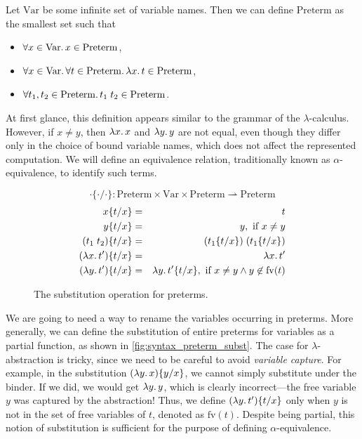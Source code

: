 \newcommand\Preterm{\mathrm{Preterm}}
\newcommand\Term{\mathrm{Term}}
\newcommand\Var{\mathrm{Var}}
\newcommand\FVars[1]{\mathrm{fv}(#1)}
\newcommand\Subst[3]{#1\{#2/#3\}}
\newcommand\Aeq{\equiv_\alpha}

Let $\Var$ be some infinite set of variable names.
Then we can define $\Preterm$ as the smallest set such that
\begin{itemize}
\item $\forall x \in \Var\ldotp x \in \Preterm$,
\item $\forall x \in \Var\ldotp\forall t \in \Preterm\ldotp \lambda x\ldotp t \in \Preterm$,
\item $\forall t_1, t_2 \in \Preterm\ldotp t_1\;t_2 \in \Preterm$.
\end{itemize}
At first glance, this definition appears similar to the grammar of the
$\lambda$-calculus.
However, if $x \neq y$, then $\lambda x\ldotp x$ and $\lambda y\ldotp y$ are
not equal, even though they differ only in the choice of bound variable names,
which does not affect the represented computation. We will define an
equivalence relation, traditionally known as $\alpha$-equivalence, to identify
such terms.

\begin{figure}[t!!]
\[
  \Subst{\cdot}{\cdot}{\cdot} \colon
  \Preterm \times \Var \times \Preterm \rightharpoonup \Preterm
\]
\begin{eqnarray*}
  \Subst{x}{t}{x}          & = & t \\
  \Subst{y}{t}{x}          & = & y, \text{ if } x \ne y \\
  \Subst{(t_1\;t_2)}{t}{x} & = & (\Subst{t_1}{t}{x})\;(\Subst{t_1}{t}{x}) \\
  \Subst{(\lambda x\ldotp t')}{t}{x} & = & \lambda x\ldotp t' \\
  \Subst{(\lambda y\ldotp t')}{t}{x} & = & \lambda y\ldotp \Subst{t'}{t}{x}, \text{ if } x \ne y \land y \not\in \FVars{t}
\end{eqnarray*}
\caption{The substitution operation for preterms.}
\label{fig:syntax_preterm_subst}
\end{figure}

We are going to need a way to rename the variables occurring in preterms.
More generally, we can define the substitution of entire preterms for
variables as a partial function, as shown in
\autoref{fig:syntax_preterm_subst}.
The case for $\lambda$-abstraction is tricky, since we need to be careful
to avoid \emph{variable capture}.
For example, in the substitution $\Subst{(\lambda y\ldotp x)}{y}{x}$,
we cannot simply substitute under the binder. If we did, we would get
$\lambda y \ldotp y$, which is clearly incorrect---the free variable $y$ was
captured by the abstraction!
Thus, we define $\Subst{(\lambda y\ldotp t')}{t}{x}$ only when $y$ is not in
the set of free variables of $t$, denoted as $\FVars{t}$. Despite being
partial, this notion of substitution is sufficient for the purpose of defining
$\alpha$-equivalence.

